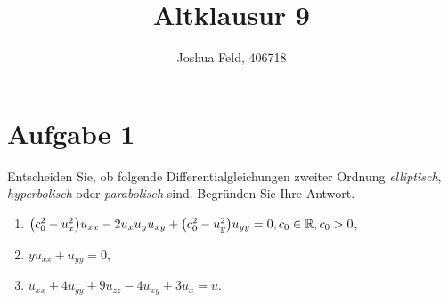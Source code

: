 \documentclass{exercise}
\institute{Applied and Computational Mathematics}
\title{Altklausur 9}
\author{Joshua Feld, 406718}
\begin{document}
    \maketitle


    \section*{Aufgabe 1}
    
    \begin{problem}
        Entscheiden Sie, ob folgende Differentialgleichungen zweiter Ordnung \emph{elliptisch}, \emph{hyperbolisch} oder \emph{parabolisch} sind.
        Begründen Sie Ihre Antwort.
        \begin{enumerate}
            \item \(\parentheses*{c_0^2 - u_x^2}u_{xx} - 2u_x u_y u_{xy} + \parentheses*{c_0^2 - u_y^2}u_{yy} = 0, c_0 \in \R, c_0 > 0\),
            \item \(yu_{xx} + u_{yy} = 0\),
            \item \(u_{xx} + 4u_{yy} + 9u_{zz} - 4u_{xy} + 3u_x = u\).
        \end{enumerate}
    \end{problem}
    
\end{document}

